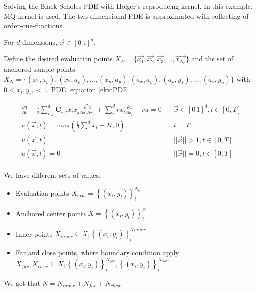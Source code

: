 \documentclass[a4paper]{article}      %
\begin{document}
Solving the Black Scholes PDE with Holger's reproducing kernel. In this example, MQ kernel is used. The two-dimensional PDE is approximated with collecting of order-one-functions. 

For $d$ dimensions, $\vec{x} \in [0\; 1]^d$.

Define the desired evaluation points $X_E = \bigl\{ \vec{x_1}, \vec{x_2}, \vec{x_3}, ..., \vec{x_{N_e}} \bigr\}$
and the set of anchored sample points  $X_N = \bigl\{ (x_1, a_y), (x_2, a_y),...,(x_n, a_y), (a_x, a_y), (a_x, y_1),...,(a_x, y_n) \bigr\}$
with $ 0 < x_i, y_i, < 1 $.
PDE, equation \ref{ekv:PDE}.

\begin{equation}
    \begin{aligned}
        &\frac{\partial u}{\partial t} + \frac{1}{2} \sum_{i, j}^d \mathbf{C}_{i,j} x_i x_j \frac{\partial^2 u}{\partial x_1 \partial x_2} + \sum_{i}^d r x_i \frac{\partial u}{\partial x_i} - ru = 0 \quad &\vec{x} \in [0\,1]^d, t \in [0, T] \\
        &u(\vec{x},t) = \mathrm{max}(\frac{1}{d}\sum^d x_i - K, 0) &t = T \\
        &u(\vec{x},t) =  &||\vec{x}|| > 1, t \in [0, T] \\
        &u(\vec{x}, t) = 0 &||\vec{x}|| = 0, t \in [0, T] \\
    \end{aligned}
    \label{ekv:PDE}
\end{equation}

We have different sets of values.
\begin{itemize}
\item Evaluation points  $X_{eval} = \left\{ (x_i, y_i) \right\}_i ^ {N_e}$
\item Anchored center points $X = \left\{ (x_i, y_i) \right\}_i ^ {N}$ 
\item Inner points $X_{inner}\subseteq X,\left\{ (x_i, y_i) \right\}_i ^ {N_inner}$
\item Far and close points, where boundary condition apply
$X_{far}, X_{close} \subseteq X,\left\{ (x_i, y_i) \right\}_i ^ {N_{far}}, \left\{ (x_i, y_i) \right\}_i ^ {N_{close}}$
\end{itemize}
We get that $N = N_{inner} + N_{far} + N_{close}$
\end{document}
